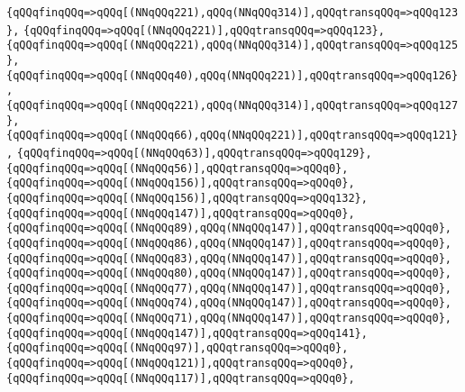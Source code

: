 \verb|{qQQqfinqQQq=>qQQq[(NNqQQq221),qQQq(NNqQQq314)],qQQqtransqQQq=>qQQq123},|\newline
\verb|{qQQqfinqQQq=>qQQq[(NNqQQq221)],qQQqtransqQQq=>qQQq123},|\newline
\verb|{qQQqfinqQQq=>qQQq[(NNqQQq221),qQQq(NNqQQq314)],qQQqtransqQQq=>qQQq125},|\newline
\verb|{qQQqfinqQQq=>qQQq[(NNqQQq40),qQQq(NNqQQq221)],qQQqtransqQQq=>qQQq126},|\newline
\verb|{qQQqfinqQQq=>qQQq[(NNqQQq221),qQQq(NNqQQq314)],qQQqtransqQQq=>qQQq127},|\newline
\verb|{qQQqfinqQQq=>qQQq[(NNqQQq66),qQQq(NNqQQq221)],qQQqtransqQQq=>qQQq121},|\newline
\verb|{qQQqfinqQQq=>qQQq[(NNqQQq63)],qQQqtransqQQq=>qQQq129},|\newline
\verb|{qQQqfinqQQq=>qQQq[(NNqQQq56)],qQQqtransqQQq=>qQQq0},|\newline
\verb|{qQQqfinqQQq=>qQQq[(NNqQQq156)],qQQqtransqQQq=>qQQq0},|\newline
\verb|{qQQqfinqQQq=>qQQq[(NNqQQq156)],qQQqtransqQQq=>qQQq132},|\newline
\verb|{qQQqfinqQQq=>qQQq[(NNqQQq147)],qQQqtransqQQq=>qQQq0},|\newline
\verb|{qQQqfinqQQq=>qQQq[(NNqQQq89),qQQq(NNqQQq147)],qQQqtransqQQq=>qQQq0},|\newline
\verb|{qQQqfinqQQq=>qQQq[(NNqQQq86),qQQq(NNqQQq147)],qQQqtransqQQq=>qQQq0},|\newline
\verb|{qQQqfinqQQq=>qQQq[(NNqQQq83),qQQq(NNqQQq147)],qQQqtransqQQq=>qQQq0},|\newline
\verb|{qQQqfinqQQq=>qQQq[(NNqQQq80),qQQq(NNqQQq147)],qQQqtransqQQq=>qQQq0},|\newline
\verb|{qQQqfinqQQq=>qQQq[(NNqQQq77),qQQq(NNqQQq147)],qQQqtransqQQq=>qQQq0},|\newline
\verb|{qQQqfinqQQq=>qQQq[(NNqQQq74),qQQq(NNqQQq147)],qQQqtransqQQq=>qQQq0},|\newline
\verb|{qQQqfinqQQq=>qQQq[(NNqQQq71),qQQq(NNqQQq147)],qQQqtransqQQq=>qQQq0},|\newline
\verb|{qQQqfinqQQq=>qQQq[(NNqQQq147)],qQQqtransqQQq=>qQQq141},|\newline
\verb|{qQQqfinqQQq=>qQQq[(NNqQQq97)],qQQqtransqQQq=>qQQq0},|\newline
\verb|{qQQqfinqQQq=>qQQq[(NNqQQq121)],qQQqtransqQQq=>qQQq0},|\newline
\verb|{qQQqfinqQQq=>qQQq[(NNqQQq117)],qQQqtransqQQq=>qQQq0},|\newline

